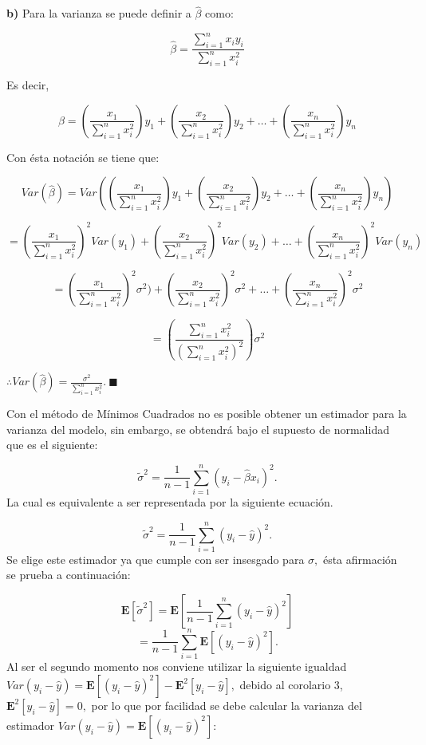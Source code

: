 \documentclass[
  a4paper,
  oneside,
  openany]{book}
\begin{document}
\textbf{b)} Para la varianza se puede definir a \(\hat{\beta}\) como:

\[\hat{\beta}=\frac{\sum_{i=1}^{n}x_{i}y_{i}}{\sum_{i=1}^{n}x_{i}^2}\]

Es decir,

\[\hat{\beta}=\left(\frac{x_{1}}{\sum_{i=1}^{n}x_{i}^2}\right)y_{1} + \left(\frac{x_{2}}{\sum_{i=1}^{n}x_{i}^2}\right)y_{2} + \ldots + \left(\frac{x_{n}}{\sum_{i=1}^{n}x_{i}^2}\right)y_{n}\]

Con ésta notación se tiene que:

\[Var\left(\hat{\beta}\right)=Var\left( \left(\frac{x_{1}}{\sum_{i=1}^{n}x_{i}^2}\right)y_{1} + \left(\frac{x_{2}}{\sum_{i=1}^{n}x_{i}^2}\right)y_{2} + \ldots + \left(\frac{x_{n}}{\sum_{i=1}^{n}x_{i}^2}\right)y_{n} \right)\]

\[=\left(\frac{x_{1}}{\sum_{i=1}^{n}x_{i}^2}\right)^2Var(y_{1}) + \left(\frac{x_{2}}{\sum_{i=1}^{n}x_{i}^2}\right)^2Var(y_{2}) + \ldots + \left(\frac{x_{n}}{\sum_{i=1}^{n}x_{i}^2}\right)^2Var(y_{n})\]

\[=\left(\frac{x_{1}}{\sum_{i=1}^{n}x_{i}^2}\right)^2\sigma^2) + \left(\frac{x_{2}}{\sum_{i=1}^{n}x_{i}^2}\right)^2\sigma^2 + \ldots + \left(\frac{x_{n}}{\sum_{i=1}^{n}x_{i}^2}\right)^2\sigma^2\]

\[=\left(\frac{\sum_{i=1}^{n}x_{i}^2}{(\sum_{i=1}^{n}x_{i}^2)^2}\right)\sigma^2\]

\(\therefore Var\left( \hat{\beta}\right)=\frac{\sigma^2}{\sum_{i=1}^{n}x_{i}^2}. \ \blacksquare\)

Con el método de Mínimos Cuadrados no es posible obtener un estimador para la varianza del modelo, sin embargo, se obtendrá bajo el supuesto de normalidad que es el siguiente:

\[\tilde{\sigma}^2=\frac{1}{n-1}\sum_{i=1}^{n}\left(y_{i}-\hat{\beta}x_{i}\right)^2.\]
La cual es equivalente a ser representada por la siguiente ecuación.

\[\tilde{\sigma}^2=\frac{1}{n-1}\sum_{i=1}^{n}(y_{i}-\hat{y})^2.\]
Se elige este estimador ya que cumple con ser insesgado para \(\sigma,\) ésta afirmación se prueba a continuación:

\[\mathbf{E}[\tilde{\sigma}^2]=\mathbf{E}\left[\frac{1}{n-1}\sum_{i=1}^{n}(y_{i}-\hat{y})^2\right]\]
\[=\frac{1}{n-1}\sum_{i=1}^{n}\mathbf{E}\left[(y_{i}-\hat{y})^2\right].\]
Al ser el segundo momento nos conviene utilizar la siguiente igualdad \(Var(y_{i}-\hat{y})=\mathbf{E}[(y_{i}-\hat{y})^2]-\mathbf{E}^2[y_{i}-\hat{y}],\) debido al corolario 3, \(\mathbf{E}^2[y_{i}-\hat{y}]=0,\) por lo que por facilidad se debe calcular la varianza del estimador \(Var(y_{i}-\hat{y})=\mathbf{E}[(y_{i}-\hat{y})^2]:\)
\end{document}
